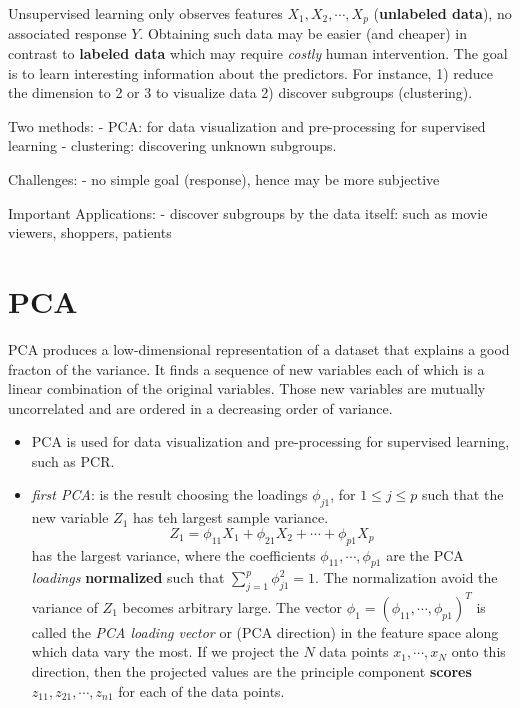 \documentclass[
  letterpaper,
  DIV=11,
  numbers=noendperiod]{scrreprt}
\providecommand{\tightlist}{%
  \setlength{\itemsep}{0pt}\setlength{\parskip}{0pt}}\usepackage{longtable,booktabs,array}
\begin{document}
Unsupervised learning only observes features \(X_1, X_2, \cdots, X_p\)
(\textbf{unlabeled data}), no associated response \(Y\). Obtaining such
data may be easier (and cheaper) in contrast to \textbf{labeled data}
which may require \emph{costly} human intervention. The goal is to learn
interesting information about the predictors. For instance, 1) reduce
the dimension to 2 or 3 to visualize data 2) discover subgroups
(clustering).

Two methods: - PCA: for data visualization and pre-processing for
supervised learning - clustering: discovering unknown subgroups.

Challenges: - no simple goal (response), hence may be more subjective

Important Applications: - discover subgroups by the data itself: such as
movie viewers, shoppers, patients

\section{PCA}\label{pca}

PCA produces a low-dimensional representation of a dataset that explains
a good fracton of the variance. It finds a sequence of new variables
each of which is a linear combination of the original variables. Those
new variables are mutually uncorrelated and are ordered in a decreasing
order of variance.

\begin{itemize}
\tightlist
\item
  PCA is used for data visualization and pre-processing for supervised
  learning, such as PCR.
\item
  \emph{first PCA}: is the result choosing the loadings \(\phi_{j1}\),
  for \(1\le j \le p\) such that the new variable \(Z_1\) has teh
  largest sample variance. \[
  Z_1 =\phi_{11}X_1 +\phi_{21}X_2+\cdots +\phi_{p1}X_p
  \] has the largest variance, where the coefficients
  \(\phi_{11}, \cdots, \phi_{p1}\) are the PCA \emph{loadings}
  \textbf{normalized} such that \(\sum_{j=1}^p \phi_{j1}^2=1\). The
  normalization avoid the variance of \(Z_1\) becomes arbitrary large.
  The vector \(\phi_1=(\phi_{11}, \cdots, \phi_{p1})^T\) is called the
  \emph{PCA loading vector} or (PCA direction) in the feature space
  along which data vary the most. If we project the \(N\) data points
  \(x_1, \cdots, x_N\) onto this direction, then the projected values
  are the principle component \textbf{scores}
  \(z_{11} , z_{21}, \cdots, z_{n1}\) for each of the data points.
\end{itemize}
\end{document}
